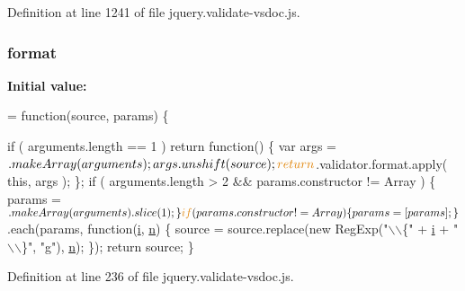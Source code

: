 {


Definition at line 1241 of file jquery.\+validate-\/vsdoc.\+js.

\subsubsection[{\texorpdfstring{format}{format}}]{\setlength{\rightskip}{0pt plus 5cm}format}\hypertarget{jquery_8validate-vsdoc_8js_a387137c43ed9616d39ba90e890d181eb}{}\label{jquery_8validate-vsdoc_8js_a387137c43ed9616d39ba90e890d181eb}
{\bfseries Initial value\+:}
\begin{DoxyCode}
= \textcolor{keyword}{function}(source, params) \{
    

    \textcolor{keywordflow}{if} ( arguments.length == 1 ) 
        \textcolor{keywordflow}{return} \textcolor{keyword}{function}() \{
            var args = $.makeArray(arguments);
            args.unshift(source);
            \textcolor{keywordflow}{return} $.validator.format.apply( \textcolor{keyword}{this}, args );
        \};
    \textcolor{keywordflow}{if} ( arguments.length > 2 && params.constructor != Array  ) \{
        params = $.makeArray(arguments).slice(1);
    \}
    \textcolor{keywordflow}{if} ( params.constructor != Array ) \{
        params = [ params ];
    \}
    $.each(params, \textcolor{keyword}{function}(\hyperlink{obj_2_release_2_package_2_package_tmp_2_scripts_2ai_80_822_89-build00167_8min_8js_aba29173262d28394924f99eb2ed5b31b}{i}, \hyperlink{obj_2_release_2_package_2_package_tmp_2_scripts_2ai_80_822_89-build00167_8min_8js_afc984c4f6c68ce30a0af99006f5f8d27}{n}) \{
        source = source.replace(\textcolor{keyword}{new} RegExp(\textcolor{stringliteral}{"\(\backslash\)\(\backslash\)\{"} + \hyperlink{obj_2_release_2_package_2_package_tmp_2_scripts_2ai_80_822_89-build00167_8min_8js_aba29173262d28394924f99eb2ed5b31b}{i} + \textcolor{stringliteral}{"\(\backslash\)\(\backslash\)\}"}, \textcolor{stringliteral}{"g"}), \hyperlink{obj_2_release_2_package_2_package_tmp_2_scripts_2ai_80_822_89-build00167_8min_8js_afc984c4f6c68ce30a0af99006f5f8d27}{n});
    \});
    \textcolor{keywordflow}{return} source;
\}
\end{DoxyCode}


Definition at line 236 of file jquery.\+validate-\/vsdoc.\+js.

}
